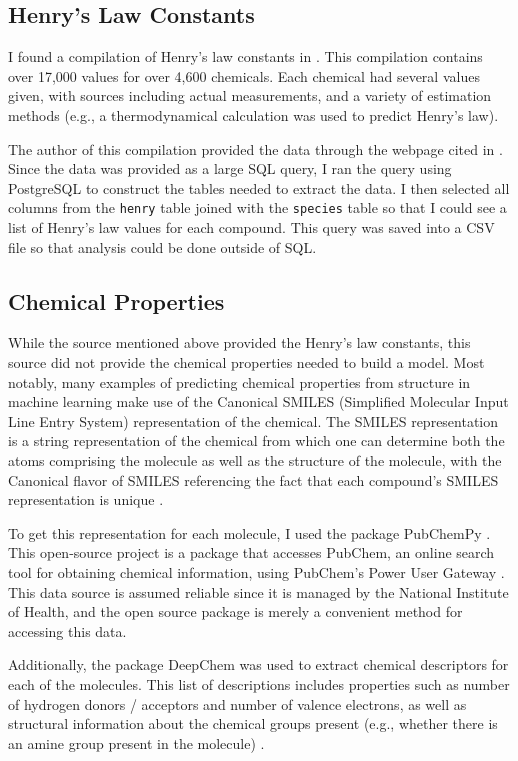 \documentclass[12pt, oneside]{article}   	%
\begin{document}
\subsection{Henry's Law Constants}
I found a compilation of Henry's law constants in \cite{sander2015}. This compilation contains over 17,000 values for over 4,600 chemicals. Each chemical had several values given, with sources including actual measurements, and a variety of estimation methods (e.g., a thermodynamical calculation was used to predict Henry's law). 

The author of this compilation provided the data through the webpage cited in \cite{sander-website}. Since the data was provided as a large SQL query, I ran the query using PostgreSQL to construct the tables needed to extract the data. I then selected all columns from  the \texttt{henry} table joined with the \texttt{species} table so that I could see a list of Henry's law values for each compound. This query was saved into a CSV file so that analysis could be done outside of SQL.

\subsection{Chemical Properties}
While the source mentioned above provided the Henry's law constants, this source did not provide the chemical properties needed to build a model. Most notably, many examples of predicting chemical properties from structure in machine learning make use of the Canonical SMILES (Simplified Molecular Input Line Entry System) representation of the chemical. The SMILES representation is a string representation of the chemical from which one can determine both the atoms comprising the molecule as well as the structure of the molecule, with the Canonical flavor of SMILES referencing the fact that each compound's SMILES representation is unique \cite{oboyle2012}.

To get this representation for each molecule, I used the package PubChemPy \cite{PubChemPy}. This open-source project is a package that accesses PubChem, an online search tool for obtaining chemical information, using PubChem's Power User Gateway \cite{kim2015}. This data source is assumed reliable since it is managed by the National Institute of Health, and the open source package is merely a convenient method for accessing this data.

Additionally, the package DeepChem was used to extract chemical descriptors for each of the molecules. This list of descriptions includes properties such as number of hydrogen donors / acceptors and number of valence electrons, as well as structural information about the chemical groups present (e.g., whether there is an amine group present in the molecule) \cite{Ramsundar-et-al-2019}. 
\end{document}
